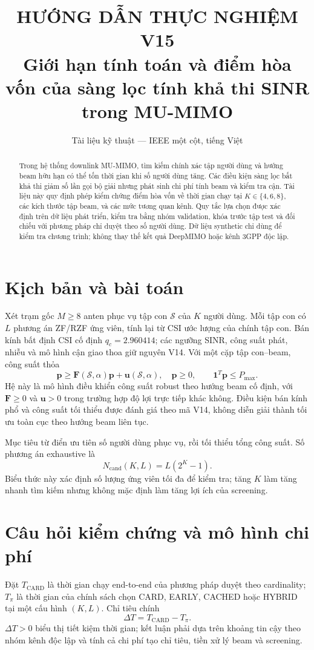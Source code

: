 \documentclass[11pt,onecolumn]{IEEEtran}
\title{HƯỚNG DẪN THỰC NGHIỆM V15\\\large Giới hạn tính toán và điểm hòa vốn của sàng lọc tính khả thi SINR trong MU-MIMO}
\author{Tài liệu kỹ thuật --- IEEE một cột, tiếng Việt}
\date{}
\begin{document}
\maketitle
\begin{abstract}
Trong hệ thống downlink MU-MIMO, tìm kiếm chính xác tập người dùng và hướng beam hữu hạn có thể tốn thời gian khi số người dùng tăng. Các điều kiện sàng lọc bất khả thi giảm số lần gọi bộ giải nhưng phát sinh chi phí tính beam và kiểm tra cận. Tài liệu này quy định phép kiểm chứng điểm hòa vốn về thời gian chạy tại $K\in\{4,6,8\}$, các kích thước tập beam, và các mức tương quan kênh. Quy tắc lựa chọn được xác định trên dữ liệu phát triển, kiểm tra bằng nhóm validation, khóa trước tập test và đối chiếu với phương pháp chỉ duyệt theo số người dùng. Dữ liệu synthetic chỉ dùng để kiểm tra chương trình; không thay thế kết quả DeepMIMO hoặc kênh 3GPP độc lập.
\end{abstract}
\section{Kịch bản và bài toán}
Xét trạm gốc $M\ge 8$ anten phục vụ tập con $\mathcal S$ của $K$ người dùng. Mỗi tập con có $L$ phương án ZF/RZF ứng viên, tính lại từ CSI ước lượng của chính tập con. Bán kính bất định CSI cố định $q_c=2.960414$; các ngưỡng SINR, công suất phát, nhiễu và mô hình cận giao thoa giữ nguyên V14. Với một cặp tập con--beam, công suất thỏa
\begin{equation}
 \mathbf p\ge\mathbf F(\mathcal S,\alpha)\mathbf p+\mathbf u(\mathcal S,\alpha),\quad
 \mathbf p\ge0,\qquad \mathbf1^T\mathbf p\le P_{\max}.
\end{equation}
Hệ này là mô hình điều khiển công suất robust theo hướng beam cố định, với $\mathbf F\ge0$ và $\mathbf u>0$ trong trường hợp độ lợi trực tiếp khác không. Điều kiện bán kính phổ và công suất tối thiểu được đánh giá theo mã V14, không diễn giải thành tối ưu toàn cục theo hướng beam liên tục.

Mục tiêu từ điển ưu tiên số người dùng phục vụ, rồi tối thiểu tổng công suất. Số phương án exhaustive là
\begin{equation}
 N_{\mathrm{cand}}(K,L)=L(2^K-1).
\end{equation}
Biểu thức này xác định số lượng ứng viên tối đa để kiểm tra; tăng $K$ làm tăng nhanh tìm kiếm nhưng không mặc định làm tăng lợi ích của screening.

\section{Câu hỏi kiểm chứng và mô hình chi phí}
Đặt $T_{\mathrm{CARD}}$ là thời gian chạy end-to-end của phương pháp duyệt theo cardinality; $T_\pi$ là thời gian của chính sách chọn CARD, EARLY, CACHED hoặc HYBRID tại một cấu hình $(K,L)$. Chỉ tiêu chính
\begin{equation}
 \Delta T=T_{\mathrm{CARD}}-T_\pi.
\end{equation}
$\Delta T>0$ biểu thị tiết kiệm thời gian; kết luận phải dựa trên khoảng tin cậy theo nhóm kênh độc lập và tính cả chi phí tạo chỉ tiêu, tiền xử lý beam và screening.
\end{document}
